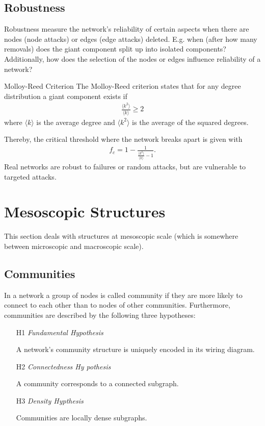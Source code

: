 \documentclass[english]{panikzettel}
\begin{document}
\subsection{Robustness}
Robustness measure the network's reliability of certain aspects when there are nodes (node attacks) or edges (edge attacks) deleted. 
E.g. when (after how many removals) does the giant component split up into isolated components? 
Additionally, how does the selection of the nodes or edges influence reliability of a network?

\begin{defi}{Molloy-Reed Criterion}
The Molloy-Reed criterion states that for any degree distribution a giant component exists if
\begin{align*}
	\frac{\langle k^2 \rangle}{\langle k \rangle} \geq 2
\end{align*}
where $ \langle k \rangle $ is the average degree and $ \langle k^2 \rangle $ is the average of the squared degrees.
\end{defi}

Thereby, the critical threshold where the network breaks apart is given with
\begin{align*}
	f_c = 1 - \frac{1}{\frac{\langle k^2 \rangle}{\langle k \rangle} - 1}.
\end{align*}
Real networks are robust to failures or random attacks, but are vulnerable to targeted attacks.

\section{Mesoscopic Structures}
This section deals with structures at mesoscopic scale (which is somewhere between microscopic and macroscopic scale).

\subsection{Communities}
In a network a group of nodes is called community if they are more likely to connect to each other than to nodes of other communities. Furthermore, communities are described by the following three hypotheses:
\begin{itemize}
	\item[H1] \textit{Fundamental Hypothesis}
	
	A network's community structure is uniquely encoded	in its wiring diagram.
	
	\item[H2] \textit{Connectedness Hy pothesis}
	
	A community corresponds to a connected subgraph.
	
	\item[H3] \textit{Density Hypthesis}
	
	Communities are locally dense subgraphs.
\end{itemize}
\end{document}
